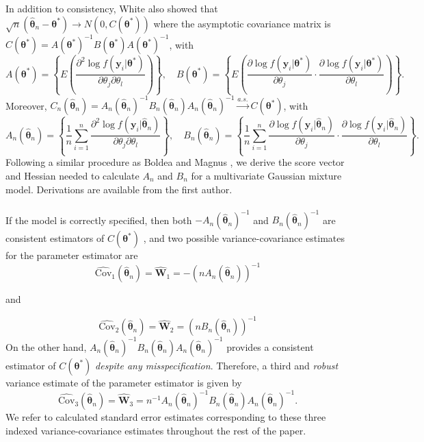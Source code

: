 \documentclass[10pt]{article}
\newcommand{\B}[0]{\mathbf}
\newcommand{\bs}[0]{\boldsymbol}
\begin{document}
In addition to consistency, White \cite{white1982} also showed that $\sqrt{n}(\hat{\bs\theta}_{n}-\bs\theta^{*})\rightarrow N(0, C(\bs\theta^{*}))$ where the asymptotic covariance matrix is
$C(\bs\theta^{*})=A(\bs\theta^{*})^{-1}B(\bs\theta^{*})A(\bs\theta^{*})^{-1}$, with
$$A(\bs\theta^{*})=\left\{E\left(\frac{\partial^{2}\log f(\B y_{i}|\bs\theta^{*})}{\partial \theta_{j}\partial\theta_{l}}\right)\right\},\quad B(\bs\theta^{*})=\left\{E\left(\frac{\partial\log f(\B y_{i}|\bs\theta^{*})}{\partial \theta_{j}}\cdot \frac{\partial\log f(\B y_{i}|\bs\theta^{*})}{\partial \theta_{l}}\right)\right\}.$$
Moreover, $C_{n}(\hat{\bs\theta}_{n})=A_{n}(\hat{\bs\theta}_{n})^{-1}B_{n}(\hat{\bs\theta}_{n})A_{n}(\hat{\bs\theta}_{n})^{-1}\stackrel{a.s.}{\rightarrow} C(\bs\theta^{*})$, with
$$A_{n}(\hat{\bs\theta}_{n})=\left\{\frac{1}{n}\sum^{n}_{i=1}\frac{\partial^{2}\log f(\B y_{i}|\hat{\bs\theta}_{n})}{\partial \theta_{j}\partial\theta_{l}}\right\},\quad B_{n}(\hat{\bs\theta}_{n})=\left\{\frac{1}{n}\sum^{n}_{i=1}\frac{\partial\log f(\B y_{i}|\hat{\bs\theta}_{n})}{\partial \theta_{j}}\cdot \frac{\partial\log f(\B y_{i}|\hat{\bs\theta}_{n})}{\partial \theta_{l}}\right\}.$$
 Following a similar procedure as Boldea and Magnus \cite{boldea2009}, we derive the score vector and Hessian needed to calculate $A_{n}$ and $B_{n}$ for a multivariate Gaussian mixture model. Derivations are available from the first author.\\\\
If the model is correctly specified, then both $-A_{n}(\hat{\bs\theta}_{n})^{-1}$ and $B_{n}(\hat{\bs\theta}_{n})^{-1}$ are consistent estimators of $C(\bs\theta^{*})$ \cite{white1982}, and two possible variance-covariance estimates for the parameter estimator are
$$\widehat{\text{Cov}}_{1}(\hat{\bs\theta}_{n}) = \widehat{\B W}_{1}=-(nA_{n}(\hat{\bs\theta}_{n}))^{-1}$$
\begin{center}and\end{center}
$$\widehat{\text{Cov}}_{2}(\hat{\bs\theta}_{n})= \widehat{\B W}_{2}=(nB_{n}(\hat{\bs\theta}_{n}))^{-1}$$
On the other hand, $A_{n}(\hat{\bs\theta}_{n})^{-1}B_{n}(\hat{\bs\theta}_{n})A_{n}(\hat{\bs\theta}_{n})^{-1}$ provides a consistent estimator of $C(\bs\theta^{*})$ {\em despite any misspecification}. Therefore, a third and {\em robust} variance estimate of the parameter estimator is given by
$$\widehat{\text{Cov}}_{3}(\hat{\bs\theta}_{n})= \widehat{\B W}_{3}=n^{-1}A_{n}(\hat{\bs\theta}_{n})^{-1}B_{n}(\hat{\bs\theta}_{n})A_{n}(\hat{\bs\theta}_{n})^{-1}.$$
 We refer to calculated standard error estimates corresponding to these three indexed variance-covariance estimates throughout the rest of the paper.
\end{document}
